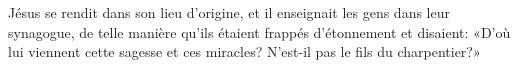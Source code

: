 \encetemps Jésus se rendit dans son lieu d’origine,
	et il enseignait les gens dans leur synagogue,
	de telle manière qu’ils étaient frappés d’étonnement et disaient:
	«D’où lui viennent cette sagesse et ces miracles?
	N’est-il pas le fils du charpentier?»
